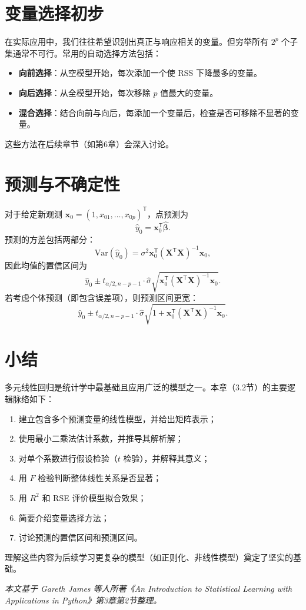 \documentclass[UTF8]{ctexart}
\numberwithin{equation}{section}
\begin{document}
\section{变量选择初步}

在实际应用中，我们往往希望识别出真正与响应相关的变量。但穷举所有 \(2^p\) 个子集通常不可行。常用的自动选择方法包括：

\begin{itemize}
    \item \textbf{向前选择}：从空模型开始，每次添加一个使 RSS 下降最多的变量。
    \item \textbf{向后选择}：从全模型开始，每次移除 \(p\) 值最大的变量。
    \item \textbf{混合选择}：结合向前与向后，每添加一个变量后，检查是否可移除不显著的变量。
\end{itemize}

这些方法在后续章节（如第6章）会深入讨论。

\section{预测与不确定性}

对于给定新观测 \(\mathbf{x}_0 = (1, x_{01},\ldots,x_{0p})^\mathsf{T}\)，点预测为
\[
\hat{y}_0 = \mathbf{x}_0^\mathsf{T} \hat{\boldsymbol{\beta}}.
\]
预测的方差包括两部分：
\[
\mathrm{Var}(\hat{y}_0) = \sigma^2 \mathbf{x}_0^\mathsf{T}(\mathbf{X}^\mathsf{T}\mathbf{X})^{-1}\mathbf{x}_0,
\]
因此均值的置信区间为
\[
\hat{y}_0 \pm t_{\alpha/2, n-p-1} \cdot \hat{\sigma} \sqrt{\mathbf{x}_0^\mathsf{T}(\mathbf{X}^\mathsf{T}\mathbf{X})^{-1}\mathbf{x}_0}.
\]
若考虑个体预测（即包含误差项），则预测区间更宽：
\[
\hat{y}_0 \pm t_{\alpha/2, n-p-1} \cdot \hat{\sigma} \sqrt{1 + \mathbf{x}_0^\mathsf{T}(\mathbf{X}^\mathsf{T}\mathbf{X})^{-1}\mathbf{x}_0}.
\]

\section{小结}

多元线性回归是统计学中最基础且应用广泛的模型之一。本章（3.2节）的主要逻辑脉络如下：

\begin{enumerate}
    \item 建立包含多个预测变量的线性模型，并给出矩阵表示；
    \item 使用最小二乘法估计系数，并推导其解析解；
    \item 对单个系数进行假设检验（\(t\) 检验），并解释其意义；
    \item 用 \(F\) 检验判断整体线性关系是否显著；
    \item 用 \(R^2\) 和 RSE 评价模型拟合效果；
    \item 简要介绍变量选择方法；
    \item 讨论预测的置信区间和预测区间。
\end{enumerate}

理解这些内容为后续学习更复杂的模型（如正则化、非线性模型）奠定了坚实的基础。

\vspace{1cm}
\begin{center}
\textit{本文基于 Gareth James 等人所著《An Introduction to Statistical Learning with Applications in Python》第3章第2节整理。}
\end{center}
\end{document}
